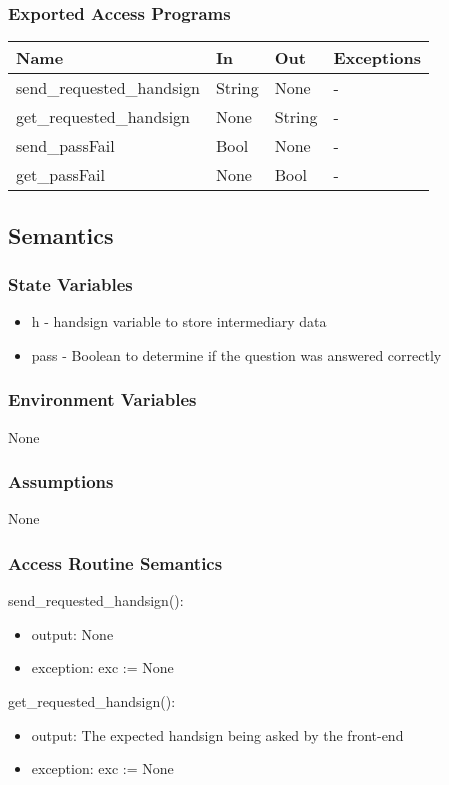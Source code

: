 \documentclass[12pt, titlepage]{article}
\begin{document}
\subsubsection{Exported Access Programs}
\begin{center}
\begin{tabular}{p{5cm} p{2cm} p{2cm} p{2cm}}
\hline
\textbf{Name} & \textbf{In} & \textbf{Out} & \textbf{Exceptions} \\
\hline
send\_requested\_handsign & String & None & - \\
get\_requested\_handsign & None & String & - \\
send\_passFail & Bool & None & - \\
get\_passFail & None & Bool & - \\
\hline
\end{tabular}
\end{center}
\subsection{Semantics}
\subsubsection{State Variables}
\begin{itemize}
    \item h - handsign variable to store intermediary data
    \item pass - Boolean to determine if the question was answered correctly
\end{itemize}
\subsubsection{Environment Variables}
None
\subsubsection{Assumptions}
None
\subsubsection{Access Routine Semantics}
\noindent send\_requested\_handsign():
\begin{itemize}
\item output: None 
\item exception: exc := None
\end{itemize}

\noindent get\_requested\_handsign():
\begin{itemize}
\item output: The expected handsign being asked by the front-end
\item exception: exc := None
\end{itemize}
\end{document}
